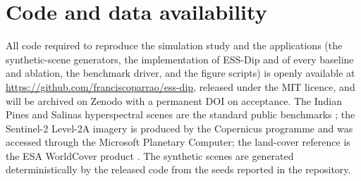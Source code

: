 \section*{Code and data availability}

All code required to reproduce the simulation study and the applications
(the synthetic-scene generators, the implementation of ESS-Dip and of every
baseline and ablation, the benchmark driver, and the figure scripts) is
openly available at \url{https://github.com/franciscoparrao/ess-dip}, released
under the MIT licence, and will be archived on Zenodo with a permanent DOI on
acceptance. The Indian Pines and Salinas hyperspectral scenes are the standard
public benchmarks \citep{Baumgardner2015}; the Sentinel-2 Level-2A imagery is
produced by the Copernicus programme and was accessed through the Microsoft
Planetary Computer; the land-cover reference is the ESA WorldCover product
\citep{Zanaga2022}. The synthetic scenes are generated deterministically by the
released code from the seeds reported in the repository.
